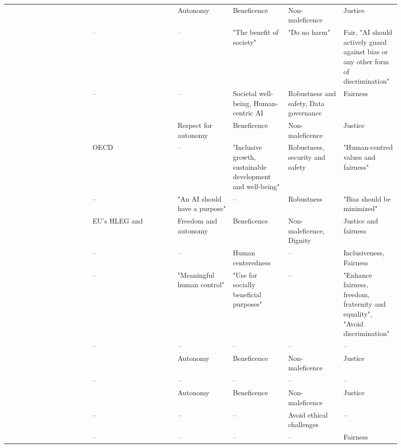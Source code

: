\begin{landscape}
\begin{ThreePartTable}
\begin{longtable}{P{0.2\linewidth}P{0.2\linewidth}P{0.13\linewidth}P{0.13\linewidth}P{0.13\linewidth}P{0.13\linewidth}}
        \textcite{Morley_2021} & \textcite{Floridi_2018} & Autonomy & Beneficence & Non-maleficence & Justice \\ 
        \textcite{Nauck_2019} & -- & -- & "The benefit of society" & "Do no harm" & Fair, "AI should \mbox{actively} guard against bias or any other form of discrimination" \\ 
        \textcite{Papagiannidis_2022} & -- & -- & Societal well-being, Human-centric AI & Robustness and safety, Data governance & Fairness \\ 
        \textcite{Peters_2020} & \textcite{Floridi_2018} & Respect for autonomy & Beneficence & Non-maleficence & Justice \\ 
        \textcite{Rizinski_2022} & OECD & -- & "Inclusive growth, sustainable development and well-being" & Robustness, security and safety & "Human-centred values and fairness" \\ 
        \textcite{Rothenberger_2019} & -- & "An AI should have a purpose" & -- & Robustness & "Bias should be \mbox{minimized}" \\ 
        \textcite{Ryan_2021} & EU's HLEG and \textcite{Jobin_2019} & Freedom and autonomy & Beneficence & Non-maleficence, \mbox{Dignity} & Justice and fairness \\ 
        \textcite{Siala_2022} & -- & -- & Human centeredness & -- & Inclusiveness, Fairness \\ 
        \textcite{Thelisson_2018} & -- & "Meaningful human control" & "Use for socially \mbox{beneficial} purposes" & -- & "Enhance fairness, freedom, fraternity and equality", "Avoid discrimination" \\ 
        \textcite{Vakkuri_2022} & -- & -- & -- & -- & -- \\ 
        \textcite{vanBruxvoort_2021} & \textcite{Floridi_2018} & Autonomy & Beneficence & Non-maleficence & Justice \\ 
        \textcite{Vetro_2019} & -- & -- & -- & -- & -- \\ 
        \textcite{WangW_2021} & \textcite{Floridi_2018} & Autonomy & Beneficence & Non-maleficence & Justice \\ 
        \textcite{WangY_2020} & -- & -- & -- & Avoid ethical \mbox{challenges} & -- \\ 
        \textcite{Werder_2022} & -- & -- & -- & -- & Fairness \\ 


\end{longtable}
\end{ThreePartTable}
\end{landscape}
